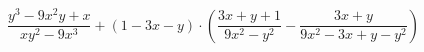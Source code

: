 \begin{ex}[type=expression]
	\begin{condition}
		\(\dfrac{y^3-9x^2y+x}{xy^2-9x^3}+(1-3x-y)\cdot\left( \dfrac{3x+y+1}{9x^2-y^2}-\dfrac{3x+y}{9x^2-3x+y-y^2} \right)\)
	\end{condition}
\end{ex}